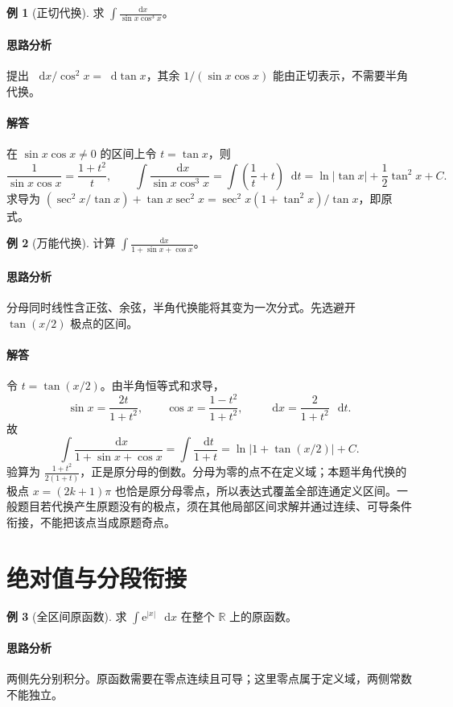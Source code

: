 \documentclass[UTF8,fontset=fandol,12pt,oneside,openany]{ctexrep}
\newcommand{\R}{\mathbb R}
\newcommand{\dd}{\mathop{}\!\mathrm d}
\newcommand{\ee}{\mathrm e}
\theoremstyle{definition}
\newtheorem{example}{例}[chapter]
\begin{document}
\begin{example}[正切代换]
求 $\displaystyle\int\frac{\dd x}{\sin x\cos^3x}$。
\end{example}
\paragraph{思路分析}提出 $\dd x/\cos^2x=\dd\tan x$，其余 $1/(\sin x\cos x)$ 能由正切表示，不需要半角代换。
\paragraph{解答}在 $\sin x\cos x\ne0$ 的区间上令 $t=\tan x$，则
\[
\frac1{\sin x\cos x}=\frac{1+t^2}{t},\qquad
\int\frac{\dd x}{\sin x\cos^3x}
=\int\left(\frac1t+t\right)\dd t
=\ln|\tan x|+\frac12\tan^2x+C.
\]
求导为 $(\sec^2x/\tan x)+\tan x\sec^2x=\sec^2x(1+\tan^2x)/\tan x$，即原式。

\begin{example}[万能代换]
计算 $\displaystyle\int\frac{\dd x}{1+\sin x+\cos x}$。
\end{example}
\paragraph{思路分析}分母同时线性含正弦、余弦，半角代换能将其变为一次分式。先选避开 $\tan(x/2)$ 极点的区间。
\paragraph{解答}令 $t=\tan(x/2)$。由半角恒等式和求导，
\[
\sin x=\frac{2t}{1+t^2},\qquad
\cos x=\frac{1-t^2}{1+t^2},\qquad
\dd x=\frac2{1+t^2}\,\dd t.
\]
故
\[
\int\frac{\dd x}{1+\sin x+\cos x}
=\int\frac{\dd t}{1+t}
=\ln|1+\tan(x/2)|+C.
\]
验算为 $\frac{1+t^2}{2(1+t)}$，正是原分母的倒数。分母为零的点不在定义域；本题半角代换的极点 $x=(2k+1)\pi$ 也恰是原分母零点，所以表达式覆盖全部连通定义区间。一般题目若代换产生原题没有的极点，须在其他局部区间求解并通过连续、可导条件衔接，不能把该点当成原题奇点。

\section{绝对值与分段衔接}
\begin{example}[全区间原函数]
求 $\displaystyle\int\ee^{|x|}\,\dd x$ 在整个 $\R$ 上的原函数。
\end{example}
\paragraph{思路分析}两侧先分别积分。原函数需要在零点连续且可导；这里零点属于定义域，两侧常数不能独立。
\end{document}
